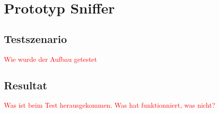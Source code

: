 



\chapter{Prototyp Sniffer} %
\label{ChapterX} %


\section{Testszenario} %
\textcolor{red}{Wie wurde der Aufbau getestet}



\section{Resultat} %
\textcolor{red}{Was ist beim Test herausgekommen. Was hat funktionniert, was nicht?}

